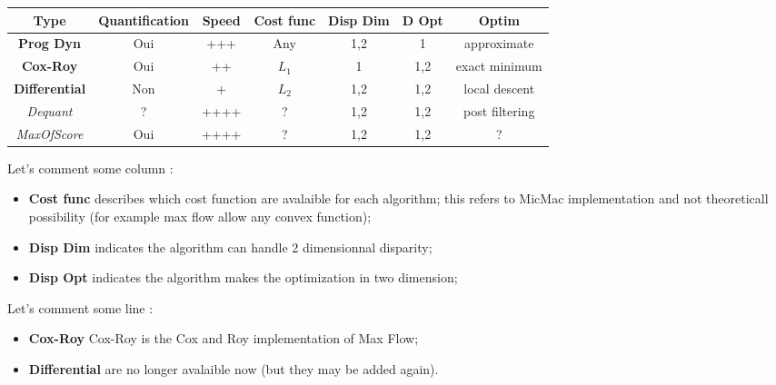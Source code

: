 \begin{tabular} { c | c | c | c| c| c | c} %

 {\bf Type }        &  {Quantification} & {Speed} & {Cost func} &  {Disp Dim} &  {D Opt} & {Optim}\\  \hline \hline
 {\bf Prog Dyn }    &  {Oui} & {+++} &          { Any} & {1,2} & {1} &{approximate}\\  \hline 
 {\bf Cox-Roy }     &  {Oui} & {++} &           {$L_1$} & {1} & {1,2} & {exact minimum}\\  \hline 
 {\bf Differential }&  {Non} & {+} &            {$L_2$} & {1,2} & {1,2} &{local descent} \\  \hline  \hline
 {\it Dequant }     &  {?} & {++++} &           { ?} & {1,2} & {1,2} &{ post filtering}\\  \hline 
 {\it MaxOfScore }  &  {Oui} & {++++} &         { ?} & {1,2} & {1,2} &{  ?} \\  \hline 

\end{tabular}


Let's comment some column :

\begin{itemize}
  \item {\bf Cost func} describes which cost function are avalaible for each algorithm;
        this refers to MicMac implementation and not theoreticall possibility (for example
        max flow allow any convex function);
       
  \item {\bf Disp  Dim}  indicates  the  algorithm can handle 2 dimensionnal disparity;

  \item {\bf Disp  Opt}  indicates  the  algorithm makes the optimization in two dimension;
        
\end{itemize}


Let's comment some line :

\begin{itemize}
   \item   {\bf   Cox-Roy } Cox-Roy  is the Cox and Roy implementation of Max Flow;
   \item   {\bf   Differential } are no longer avalaible now (but they may be added again).
\end{itemize}


